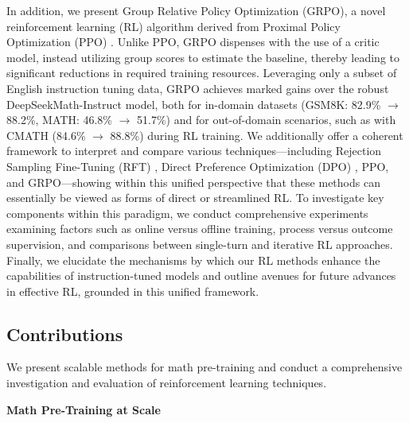 In addition, we present Group Relative Policy Optimization (GRPO), a novel reinforcement learning (RL) algorithm derived from Proximal Policy Optimization (PPO) \citep{schulman2017proximal}. Unlike PPO, GRPO dispenses with the use of a critic model, instead utilizing group scores to estimate the baseline, thereby leading to significant reductions in required training resources. Leveraging only a subset of English instruction tuning data, GRPO achieves marked gains over the robust DeepSeekMath-Instruct model, both for in-domain datasets (GSM8K: 82.9\% $\rightarrow$ 88.2\%, MATH: 46.8\% $\rightarrow$ 51.7\%) and for out-of-domain scenarios, such as with CMATH (84.6\% $\rightarrow$ 88.8\%) during RL training. We additionally offer a coherent framework to interpret and compare various techniques—including Rejection Sampling Fine-Tuning (RFT) \citep{yuan2023scaling}, Direct Preference Optimization (DPO) \citep{dpo}, PPO, and GRPO—showing within this unified perspective that these methods can essentially be viewed as forms of direct or streamlined RL. To investigate key components within this paradigm, we conduct comprehensive experiments examining factors such as online versus offline training, process versus outcome supervision, and comparisons between single-turn and iterative RL approaches. Finally, we elucidate the mechanisms by which our RL methods enhance the capabilities of instruction-tuned models and outline avenues for future advances in effective RL, grounded in this unified framework.

\subsection{Contributions}
We present scalable methods for math pre-training and conduct a comprehensive investigation and evaluation of reinforcement learning techniques.

\textbf{Math Pre-Training at Scale}

